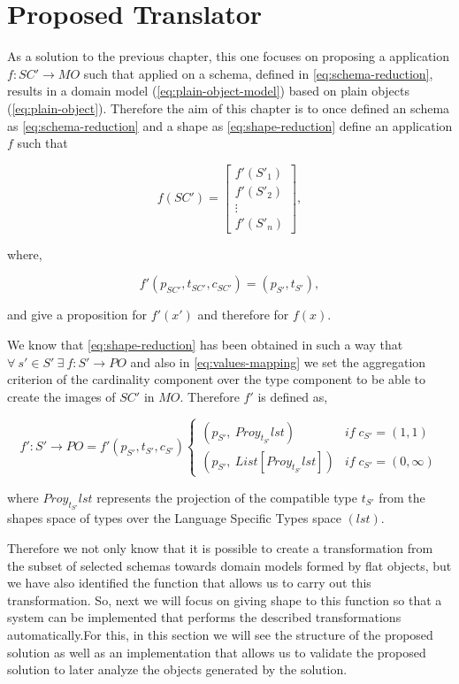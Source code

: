 \chapter{Proposed Translator}
\label{ch:proposed-system}
As a solution to the previous chapter, this one focuses on proposing a application $f : SC' \rightarrow MO$ such that applied on a
schema, defined in \cref{eq:schema-reduction}, results in a domain model (\cref{eq:plain-object-model}) based on plain objects (\cref{eq:plain-object}).
Therefore the aim of this chapter is to once defined an schema as \cref{eq:schema-reduction} and a shape as \cref{eq:shape-reduction} define
an application $f$ such that

\begin{equation}
f(SC')=
\begin{bmatrix}f'(S'_1)
\\ f'(S'_2)
\\ \vdots
\\ f'(S'_n)
\end{bmatrix},
\end{equation}

where,

\begin{equation}
	f'(p_{SC'},t_{SC'},c_{SC'}) = (p_{S'},t_{S'}),
\end{equation}

and give a proposition for $f'(x')$ and therefore for $f(x)$.

We know that \cref{eq:shape-reduction} has been obtained in such a way that $\forall\ s' \in S'\ \exists\ f:S' \rightarrow PO$ and also in \cref{eq:values-mapping} we set
the aggregation criterion of the cardinality component over the type component to be able to create the images of $SC'$ in $MO$. Therefore $f'$ is defined as,

\begin{equation}\label{eq:transformation-f}
f':S' \rightarrow PO = f'(p_{S'},t_{S'},c_{S'}) \begin{cases}
	(p_{S'},\ Proy_{t_{S'}}lst) & if \; c_{S'}=(1,1) \\
	(p_{S'},\ List[Proy_{t_{S'}}lst]) & if \; c_{S'}=(0,\infty)
   \end{cases}
\end{equation}

where $Proy_{t_{S'}}lst$ represents the projection of the compatible type $t_{S'}$ from the shapes space of types
over the Language Specific Types space $(lst)$.

Therefore we not only know that it is possible to create a transformation from the subset of selected schemas
towards domain models formed by flat objects, but we have also identified the function that allows us to carry
out this transformation. So, next we will focus on giving shape to this function so that a system can be
implemented that performs the described transformations automatically.For this, in this section we will see
the structure of the proposed solution as well as an implementation that allows us to validate the proposed
solution to later analyze the objects generated by the solution.


